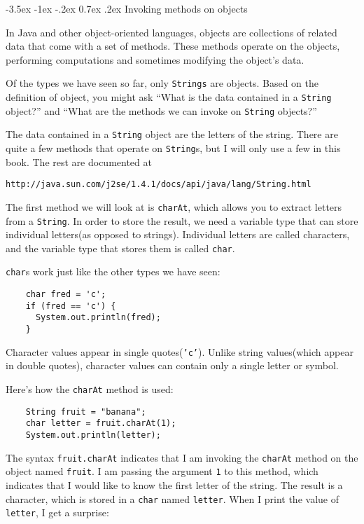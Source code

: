 \documentclass{book}
\makeatletter
\renewcommand{\section}{\@startsection 
    {section} {1} {0mm}%
    {-3.5ex \@plus -1ex \@minus -.2ex}%
    {0.7ex \@plus.2ex}%
    {\normalfont\Large\bfseries}}
\makeatother
\begin{document}
\section{Invoking methods on objects}

In Java and other object-oriented languages, objects are collections
of related data that come with a set of methods.  These methods
operate on the objects, performing computations and sometimes
modifying the object's data.

Of the types we have seen so far, only {\tt Strings} are objects.
Based on the definition of object, you might ask ``What is the data
contained in a {\tt String} object?'' and ``What are the methods we
can invoke on {\tt String} objects?''


The data contained in a {\tt String} object are the letters of the string.
There are quite a few methods that operate on {\tt String}s, but
I will only use a few in this book.  The rest are documented at

\begin{verbatim}
http://java.sun.com/j2se/1.4.1/docs/api/java/lang/String.html
\end{verbatim}
%
The first method we will look at is {\tt charAt}, which allows you
to extract letters from a {\tt String}.  In order to store the result, we
need a variable type that can store individual letters(as opposed
to strings).  Individual letters are called characters, and the
variable type that stores them is called {\tt char}.


{\tt char}s work just like the other types we have seen:

\begin{verbatim}
    char fred = 'c';
    if (fred == 'c') {
      System.out.println(fred);
    }
\end{verbatim}
%
Character values appear in single quotes({\tt 'c'}).  Unlike
string values(which appear in double quotes), character values
can contain only a single letter or symbol.


Here's how the {\tt charAt} method is used:

\begin{verbatim}
    String fruit = "banana";
    char letter = fruit.charAt(1);
    System.out.println(letter);
\end{verbatim}
%
The syntax {\tt fruit.charAt} indicates that I am 
invoking the {\tt charAt} method on the object named
{\tt fruit}.
I am passing the argument {\tt 1} to this method,
which indicates that I would like to know the first letter of
the string.  The result is a character, which is stored in a
{\tt char} named {\tt letter}.  When I print the value of
{\tt letter}, I get a surprise:
\end{document}
